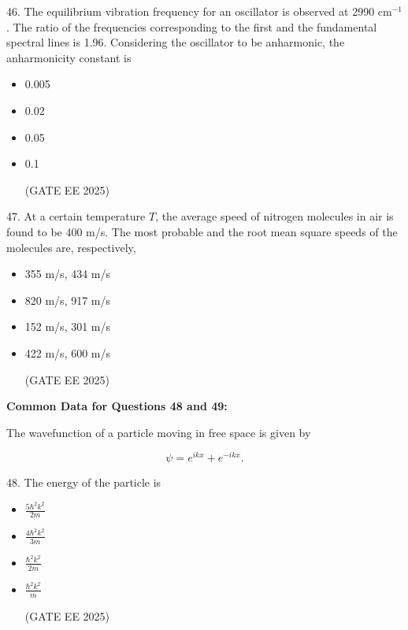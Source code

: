 \documentclass[twocolumn]{article}
\begin{document}
46. The equilibrium vibration frequency for an oscillator is observed at 2990 cm$^{-1}$.  
The ratio of the frequencies corresponding to the first and the fundamental spectral lines is 1.96.  
Considering the oscillator to be anharmonic, the anharmonicity constant is

\begin{itemize}
\item[(A)] 0.005

\item[(B)] 0.02

\item[(C)] 0.05

\item[(D)] 0.1

(GATE EE 2025)
  \end{itemize}




47. At a certain temperature $T$, the average speed of nitrogen molecules in air is found to be 400 m/s.  
The most probable and the root mean square speeds of the molecules are, respectively,

\begin{itemize}
\item[(A)] 355 m/s, 434 m/s

\item[(B)] 820 m/s, 917 m/s

\item[(C)] 152 m/s, 301 m/s

\item[(D)] 422 m/s, 600 m/s

(GATE EE 2025)
  \end{itemize}




\textbf{Common Data for Questions 48 and 49:}

The wavefunction of a particle moving in free space is given by

\[
\psi = e^{i k x} + e^{-i k x}.
\]



48. The energy of the particle is

\begin{itemize}
\item[(A)] $\frac{5 \hbar^2 k^2}{2m}$

\item[(B)] $\frac{4 \hbar^2 k^2}{3m}$

\item[(C)] $\frac{\hbar^2 k^2}{2m}$

\item[(D)] $\frac{\hbar^2 k^2}{m}$

(GATE EE 2025)
  \end{itemize}
\end{document}
